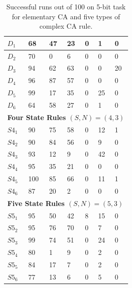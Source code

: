 \documentclass{elsarticle}
\begin{document}
\begin{multicols}{2}
\begin{table}[!htbp]
\begin{tabular}{|l|l|l|l|l|l|l|}
			$D_{1}$  & 68  & 47  & 23  & 0  & 1  & 0  \\ \hline
			$D_{2}$  & 70  & 0   & 6   & 0  & 0  & 0  \\ \hline
			$D_{3}$  & 94  & 62  & 63  & 0  & 0  & 20 \\ \hline
			$D_{4}$  & 96  & 87  & 57  & 0  & 0  & 0  \\ \hline
			$D_{5}$  & 99  & 17  & 35  & 0  & 25 & 0  \\ \hline
			$D_{6}$  & 64  & 58  & 27  & 0  & 1  & 0  \\ \hline
			\multicolumn{7}{|l|}{\textbf{Four State Rules \boldmath$(S,N) = (4,3)$}} \\ 
			\hline
			$S4_{1}$ & 90  & 75  & 58  & 0  & 12 & 1  \\ \hline
			$S4_{2}$ & 90  & 84  & 56  & 0  & 9  & 0  \\ \hline
			$S4_{3}$ & 93  & 12  & 9   & 0  & 42 & 0  \\ \hline
			$S4_{4}$ & 95  & 35  & 21  & 0  & 0  & 0  \\ \hline
			$S4_{5}$ & 100 & 85  & 66  & 0  & 11 & 1  \\ \hline
			$S4_{6}$ & 87  & 20  & 2   & 0  & 0  & 0  \\ \hline
			\multicolumn{7}{|l|}{\textbf{Five State Rules \boldmath$(S,N) = (5,3)$}} \\ 
			\hline
			$S5_{1}$ & 95  & 50  & 42  & 8  & 15 & 0  \\ \hline
			$S5_{2}$ & 95  & 76  & 70  & 0  & 7  & 0  \\ \hline
                        $S5_{3}$ & 99  & 74  & 51  & 0  & 24 & 0  \\ \hline
                        $S5_{4}$ & 80  & 1   & 9   & 0  & 2  & 0  \\ \hline
			$S5_{5}$ & 84  & 17  & 7   & 0  & 2  & 0  \\ \hline
			$S5_{6}$ & 77  & 13  & 6   & 0  & 5  & 0  \\ \hline
		\end{tabular}
		\caption{Successful runs out of 100 on 5-bit task for elementary CA and five 
		types of complex CA rule.}
		\label{table:results}
	\end{table}
	
	
	

\end{multicols}
\end{document}
